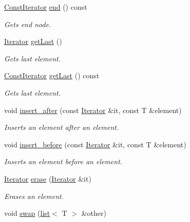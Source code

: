 \begin{DoxyCompactItemize}
\hyperlink{classirr_1_1core_1_1list_1_1ConstIterator}{Const\+Iterator} \hyperlink{classirr_1_1core_1_1list_a6209ac37decfb5f29da921ea40b46e10}{end} () const
\begin{DoxyCompactList}\small\item\em Gets end node. \end{DoxyCompactList}\item 
\hyperlink{classirr_1_1core_1_1list_1_1Iterator}{Iterator} \hyperlink{classirr_1_1core_1_1list_a6ba09d4c7865a451e40b5bd5f4c2dd50}{get\+Last} ()
\begin{DoxyCompactList}\small\item\em Gets last element. \end{DoxyCompactList}\item 
\hyperlink{classirr_1_1core_1_1list_1_1ConstIterator}{Const\+Iterator} \hyperlink{classirr_1_1core_1_1list_a7b296ee9e099847dadf9a0a18df842e9}{get\+Last} () const
\begin{DoxyCompactList}\small\item\em Gets last element. \end{DoxyCompactList}\item 
void \hyperlink{classirr_1_1core_1_1list_aa4b91d7a9191fc98266425366b774c8a}{insert\+\_\+after} (const \hyperlink{classirr_1_1core_1_1list_1_1Iterator}{Iterator} \&it, const T \&element)
\begin{DoxyCompactList}\small\item\em Inserts an element after an element. \end{DoxyCompactList}\item 
void \hyperlink{classirr_1_1core_1_1list_a366070e0356029f0b355f5dd81710b29}{insert\+\_\+before} (const \hyperlink{classirr_1_1core_1_1list_1_1Iterator}{Iterator} \&it, const T \&element)
\begin{DoxyCompactList}\small\item\em Inserts an element before an element. \end{DoxyCompactList}\item 
\hyperlink{classirr_1_1core_1_1list_1_1Iterator}{Iterator} \hyperlink{classirr_1_1core_1_1list_a407935fc79a35ce7caa19e4f6ce25c3f}{erase} (\hyperlink{classirr_1_1core_1_1list_1_1Iterator}{Iterator} \&it)
\begin{DoxyCompactList}\small\item\em Erases an element. \end{DoxyCompactList}\item 
void \hyperlink{classirr_1_1core_1_1list_a860e4dab70f2ac5f13b9385f7f63d5b9}{swap} (\hyperlink{classirr_1_1core_1_1list}{list}$<$ T $>$ \&other)

\end{DoxyCompactItemize}
